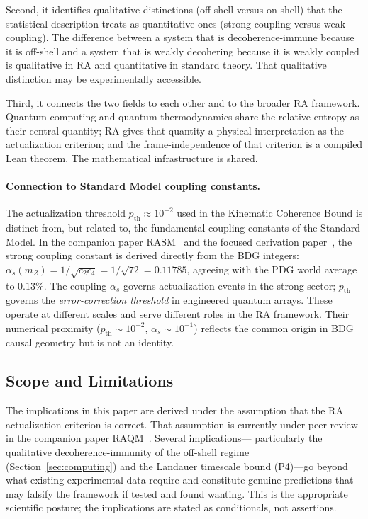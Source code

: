 \documentclass[11pt,a4paper]{article}
\theoremstyle{plain}
\theoremstyle{definition}
\theoremstyle{remark}
\begin{document}
Second, it identifies qualitative distinctions (off-shell versus on-shell) that the
statistical description treats as quantitative ones (strong coupling versus weak
coupling). The difference between a system that is decoherence-immune because it
is off-shell and a system that is weakly decohering because it is weakly coupled is
qualitative in RA and quantitative in standard theory. That qualitative distinction
may be experimentally accessible.

Third, it connects the two fields to each other and to the broader RA framework.
Quantum computing and quantum thermodynamics share the relative entropy as their
central quantity; RA gives that quantity a physical interpretation as the
actualization criterion; and the frame-independence of that criterion is a compiled
Lean theorem. The mathematical infrastructure is shared.

\paragraph{Connection to Standard Model coupling constants.}
The actualization threshold $p_{\mathrm{th}} \approx 10^{-2}$ used in the
Kinematic Coherence Bound is distinct from, but related to, the fundamental
coupling constants of the Standard Model. In the companion paper
RASM~\citep{Sandeman2026RASM} and the focused derivation
paper~\citep{Sandeman2026BDG}, the strong coupling constant is derived directly
from the BDG integers: $\alpha_s(m_Z) = 1/\sqrt{c_2 c_4} = 1/\sqrt{72} = 0.11785$,
agreeing with the PDG world average to $0.13\%$.  The coupling $\alpha_s$ governs
actualization events in the strong sector; $p_{\mathrm{th}}$ governs the
\emph{error-correction threshold} in engineered quantum arrays.  These operate at
different scales and serve different roles in the RA framework.  Their numerical
proximity ($p_{\mathrm{th}} \sim 10^{-2}$, $\alpha_s \sim 10^{-1}$) reflects the
common origin in BDG causal geometry but is not an identity.

\subsection{Scope and Limitations}

The implications in this paper are derived under the assumption that the RA
actualization criterion is correct. That assumption is currently under peer review
in the companion paper RAQM~\citep{Sandeman2026a}. Several implications---
particularly the qualitative decoherence-immunity of the off-shell regime
(Section~\ref{sec:computing}) and the Landauer timescale bound (P4)---go beyond
what existing experimental data require and constitute genuine predictions that may
falsify the framework if tested and found wanting. This is the appropriate
scientific posture; the implications are stated as conditionals, not assertions.
\end{document}
